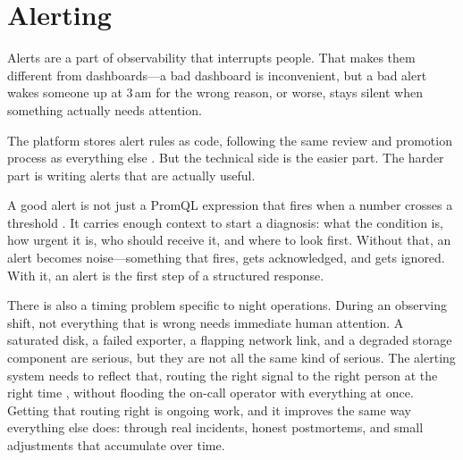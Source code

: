 \section{Alerting}

Alerts are a part of observability that interrupts people. That makes them different from
dashboards---a bad dashboard is inconvenient, but a bad alert wakes someone up at 3\,am for the
wrong reason, or worse, stays silent when something actually needs attention.

The platform stores alert rules as code, following the same review and promotion process as
everything else \cite{lsst-it-k8s-cookbook,prometheus-alerting,prometheus-alertmanager}. But the
technical side is the easier part. The harder part is writing alerts that are actually useful.

A good alert is not just a PromQL expression that fires when a number crosses a threshold
\cite{prometheus-alerting,prometheus-alertmanager}. It carries enough context to start a diagnosis:
what the condition is, how urgent it is, who should receive it, and where to look first. Without
that, an alert becomes noise---something that fires, gets acknowledged, and gets ignored. With it,
an alert is the first step of a structured response.

There is also a timing problem specific to night operations. During an observing shift, not
everything that is wrong needs immediate human attention. A saturated disk, a failed exporter, a
flapping network link, and a degraded storage component are serious, but they are not all the same
kind of serious. The alerting system needs to reflect that, routing the right signal to the right
person at the right time \cite{prometheus-alertmanager}, without flooding the on-call operator with
everything at once. Getting that routing right is ongoing work, and it improves the same way
everything else does: through real incidents, honest postmortems, and small adjustments that
accumulate over time.

